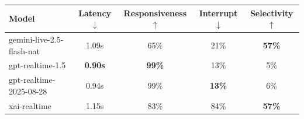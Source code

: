 \begin{tabular}{@{}lcccc@{}}
\toprule
\textbf{Model} & \textbf{Latency}$\downarrow$ & \textbf{Responsiveness}$\uparrow$ & \textbf{Interrupt}$\downarrow$ & \textbf{Selectivity}$\uparrow$ \\
\midrule
gemini-live-2.5-flash-nat & 1.09s & 65\% & 21\% & \textbf{57\%} \\
gpt-realtime-1.5 & \textbf{0.90s} & \textbf{99\%} & 13\% & 5\% \\
gpt-realtime-2025-08-28 & 0.94s & 99\% & \textbf{13\%} & 6\% \\
xai-realtime & 1.15s & 83\% & 84\% & \textbf{57\%} \\
\bottomrule
\end{tabular}